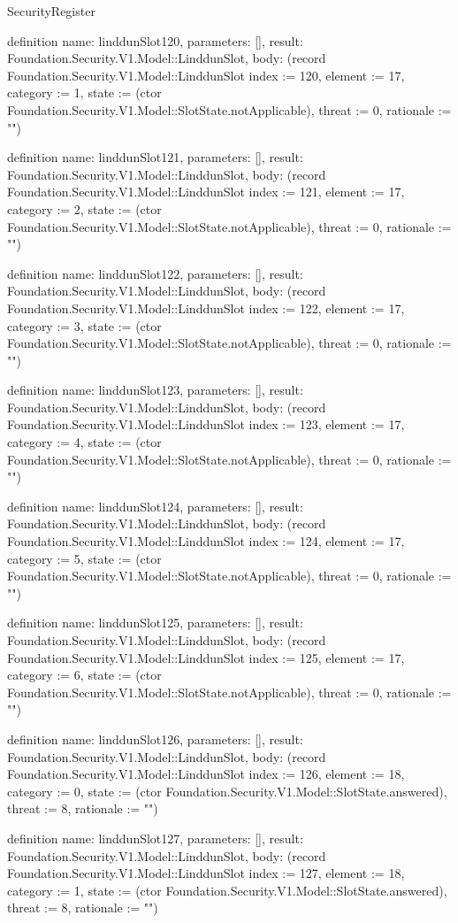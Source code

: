 \begin{lexlean}{SecurityRegister}
\begin{semanticmodule}
definition{
  name: linddunSlot120,
  parameters: [],
  result: Foundation.Security.V1.Model::LinddunSlot,
  body: (record Foundation.Security.V1.Model::LinddunSlot {index := 120, element := 17, category := 1, state := (ctor Foundation.Security.V1.Model::SlotState.notApplicable), threat := 0, rationale := ""})
}

definition{
  name: linddunSlot121,
  parameters: [],
  result: Foundation.Security.V1.Model::LinddunSlot,
  body: (record Foundation.Security.V1.Model::LinddunSlot {index := 121, element := 17, category := 2, state := (ctor Foundation.Security.V1.Model::SlotState.notApplicable), threat := 0, rationale := ""})
}

definition{
  name: linddunSlot122,
  parameters: [],
  result: Foundation.Security.V1.Model::LinddunSlot,
  body: (record Foundation.Security.V1.Model::LinddunSlot {index := 122, element := 17, category := 3, state := (ctor Foundation.Security.V1.Model::SlotState.notApplicable), threat := 0, rationale := ""})
}

definition{
  name: linddunSlot123,
  parameters: [],
  result: Foundation.Security.V1.Model::LinddunSlot,
  body: (record Foundation.Security.V1.Model::LinddunSlot {index := 123, element := 17, category := 4, state := (ctor Foundation.Security.V1.Model::SlotState.notApplicable), threat := 0, rationale := ""})
}

definition{
  name: linddunSlot124,
  parameters: [],
  result: Foundation.Security.V1.Model::LinddunSlot,
  body: (record Foundation.Security.V1.Model::LinddunSlot {index := 124, element := 17, category := 5, state := (ctor Foundation.Security.V1.Model::SlotState.notApplicable), threat := 0, rationale := ""})
}

definition{
  name: linddunSlot125,
  parameters: [],
  result: Foundation.Security.V1.Model::LinddunSlot,
  body: (record Foundation.Security.V1.Model::LinddunSlot {index := 125, element := 17, category := 6, state := (ctor Foundation.Security.V1.Model::SlotState.notApplicable), threat := 0, rationale := ""})
}

definition{
  name: linddunSlot126,
  parameters: [],
  result: Foundation.Security.V1.Model::LinddunSlot,
  body: (record Foundation.Security.V1.Model::LinddunSlot {index := 126, element := 18, category := 0, state := (ctor Foundation.Security.V1.Model::SlotState.answered), threat := 8, rationale := ""})
}

definition{
  name: linddunSlot127,
  parameters: [],
  result: Foundation.Security.V1.Model::LinddunSlot,
  body: (record Foundation.Security.V1.Model::LinddunSlot {index := 127, element := 18, category := 1, state := (ctor Foundation.Security.V1.Model::SlotState.answered), threat := 8, rationale := ""})
}


\end{semanticmodule}
\end{lexlean}
